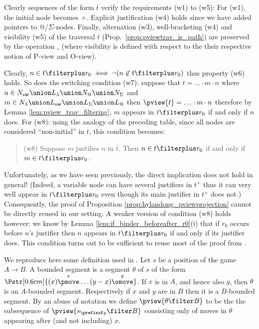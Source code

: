 Clearly sequences of the form $\overline{t}$ verify the requirements (w1) to (w5): For (w1), the initial node
becomes $\diamond$. Explicit justification (w4) holds since we have added pointers to @/$\Sigma$-nodes.
Finally, alternation (w3), well-bracketing (w4) and visibility (w5) of the traversal $t$ (Prop.\
\ref{prop:pviewtrav_is_path}) are preserved by the operation $\overline{\_}$
(where visibility is defined with respect to the their respective
notion of P-view and O-view).

Clearly, $n \in t\filterplus r_0 \iff \neg ( n \not\in t\filterplus
r_0)$ thus property (w6) holds. So does the switching condition
(w7): suppose that $t = \ldots \cdot m \cdot n$ where $n\in N_{\sf var}
\union L_\lambda \union N_@ \union N_\Sigma$ and $m \in N_\lambda
\union L_{\sf var} \union L_\Sigma \union L_@$ then $\pview{t} =
\ldots \cdot m \cdot n$ therefore by Lemma
\ref{lem:pview_trav_filtering}, $m$ appears in $t\filterplus r_0$ if
and only if $n$ does.
For (w8): using the analogy of the preceding table, since all nodes
are considered ``non-initial'' in $\overline{t}$, this condition
becomes:
\begin{quote}
 (w8) Suppose $m$ justifies $n$ in $\overline{t}$. Then $n \in t\filterplus r_0$ if and only if $m\in t\filterplus r_0$.
\end{quote}
Unfortunately, as we have seen previously, the direct implication does not hold in general! (Indeed, a variable node can have several
justifiers in $t^+$ thus it can very well appear in $t\filterplus r_0$ even though its main justifier in $t^+$ does not.) Consequently, the proof of Proposition \ref{prop:hylandong_pviewprojection} cannot be
directly reused in our setting. A weaker version of condition (w8) holds however: we know by Lemma \ref{lem:if_binder_beforeafter_r0}(i) that if $r_0$ occurs before $n$'s justifier then $n$ appears in
$t\filterplus r_0$ if and only if its justifier does.
This condition turns out to be sufficient to reuse most of the proof from \cite{hylandong_pcf}.

We reproduce here some definition used in \cite{hylandong_pcf}. Let
$s$ be a position of the game $A\rightarrow B$. A bounded segment is
a segment $\theta$ of $s$ of the form
$\Pstr[0.6cm]{(x){\stackrel{x}\pmove} \ldots
(y-x){\stackrel{y}\omove}}$. If $x$ is in $A$, and hence also $y$,
then $\theta$ is an $A$-bounded segment. Respectively if $x$ and $y$
are in $B$ then it is a $B$-bounded segment. By an abuse of notation
we define $\pview{\theta \filter B}$ to be the the subsequence of
$\pview{s_{\prefixof y} \filter B}$ consisting only of moves in
$\theta$ appearing after (and not including) $x$.

